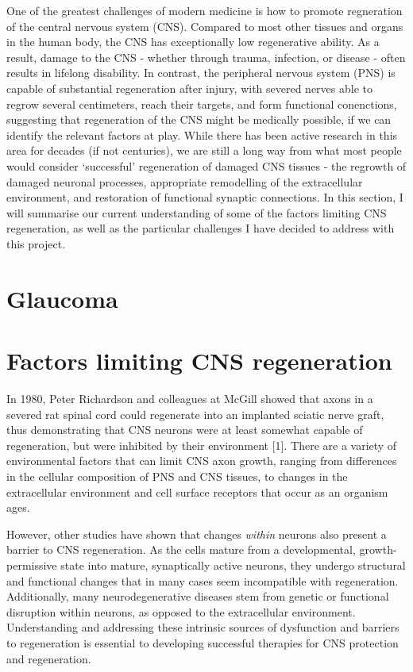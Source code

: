\documentclass[
  12pt,
  a4paper,
]{book}
\begin{document}

One of the greatest challenges of modern medicine is how to promote regneration of the central nervous system (CNS). Compared to most other tissues and organs in the human body, the CNS has exceptionally low regenerative ability. As a result, damage to the CNS - whether through trauma, infection, or disease - often results in lifelong disability. In contrast, the peripheral nervous system (PNS) is capable of substantial regeneration after injury, with severed nerves able to regrow several centimeters, reach their targets, and form functional conenctions, suggesting that regeneration of the CNS might be medically possible, if we can identify the relevant factors at play. While there has been active research in this area for decades (if not centuries), we are still a long way from what most people would consider `successful' regeneration of damaged CNS tissues - the regrowth of damaged neuronal processes, appropriate remodelling of the extracellular environment, and restoration of functional synaptic connections. In this section, I will summarise our current understanding of some of the factors limiting CNS regeneration, as well as the particular challenges I have decided to address with this project.

\hypertarget{glaucoma}{%
\section{Glaucoma}\label{glaucoma}}

\hypertarget{factors-limiting-cns-regeneration}{%
\section{Factors limiting CNS regeneration}\label{factors-limiting-cns-regeneration}}

In 1980, Peter Richardson and colleagues at McGill showed that axons in a severed rat spinal cord could regenerate into an implanted sciatic nerve graft, thus demonstrating that CNS neurons were at least somewhat capable of regeneration, but were inhibited by their environment {[}1{]}. There are a variety of environmental factors that can limit CNS axon growth, ranging from differences in the cellular composition of PNS and CNS tissues, to changes in the extracellular environment and cell surface receptors that occur as an organism ages.

However, other studies have shown that changes \emph{within} neurons also present a barrier to CNS regeneration. As the cells mature from a developmental, growth-permissive state into mature, synaptically active neurons, they undergo structural and functional changes that in many cases seem incompatible with regeneration. Additionally, many neurodegenerative diseases stem from genetic or functional disruption within neurons, as opposed to the extracellular environment. Understanding and addressing these intrinsic sources of dysfunction and barriers to regeneration is essential to developing successful therapies for CNS protection and regeneration.
\end{document}
